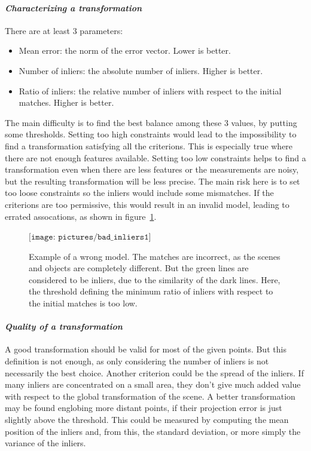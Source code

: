 \clearpage
\paragraph{\emph{Characterizing a transformation}}

There are at least 3 parameters:
\begin{itemize}
\item Mean error: the norm of the error vector. Lower is better.
\item Number of inliers: the absolute number of inliers. Higher is better.
\item Ratio of inliers: the relative number of inliers with respect to the initial matches. Higher is better.
\end{itemize}

The main difficulty is to find the best balance among these 3 values, by putting some thresholds. Setting too high constraints would lead to the impossibility to find a transformation satisfying all the criterions. This is especially true where there are not enough features available. Setting too low constraints helps to find a transformation even when there are less features or the measurements are noisy, but the resulting transformation will be less precise. The main risk here is to set too loose constraints so the inliers would include some mismatches. If the criterions are too permissive, this would result in an invalid model, leading to errated assocations, as shown in figure~\ref{fig:bad_inliers}. 

\begin{figure}[H]
\centering$
\texttt{[image: pictures/bad\_inliers1]}$
\caption{Example of a wrong model. The matches are incorrect, as the scenes and objects are completely different. But the green lines are considered to be inliers, due to the similarity of the dark lines. Here, the threshold defining the minimum ratio of inliers with respect to the initial matches is too low.}
\label{fig:bad_inliers}
\end{figure}

\paragraph{\emph{Quality of a transformation}}

A good transformation should be valid for most of the given points. But this definition is not enough, as only considering the number of inliers is not necessarily the best choice. Another criterion could be the spread of the inliers. If many inliers are concentrated on a small area, they don't give much added value with respect to the global transformation of the scene. A better transformation may be found englobing more distant points, if their projection error is just slightly above the threshold. This could be measured by computing the mean position of the inliers and, from this, the standard deviation, or more simply the variance of the inliers.


